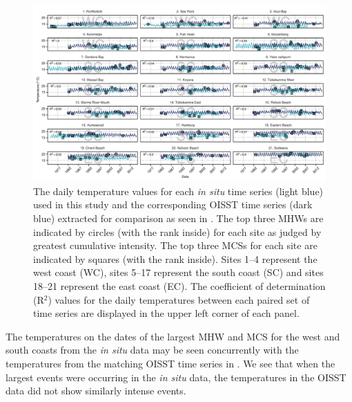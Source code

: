 \documentclass[a4paper,10pt,review]{elsarticle}
\begin{document}
\begin{figure}
\centering
\includegraphics[width=1.0\textwidth]{figure2.pdf}
\caption{The daily temperature values for each \emph{in situ} time series (light blue) used in this study and the corresponding OISST time series (dark blue) extracted for comparison as seen in . The top three MHWs are indicated by circles (with the rank inside) for each site as judged by greatest cumulative intensity. The top three MCSs for each site are indicated by squares (with the rank inside). Sites 1--4 represent the west coast (WC), sites 5--17 represent the south coast (SC) and sites 18--21 represent the east coast (EC). The coefficient of determination (R$^2$) values for the daily temperatures between each paired set of time series are displayed in the upper left corner of each panel.}
\label{fig:Figure2}
\end{figure}

The temperatures on the dates of the largest MHW and MCS for the west and south coasts from the \emph{in situ} data may be seen concurrently with the temperatures from the matching OISST time series in . We see that when the largest events were occurring in the \emph{in situ} data, the temperatures in the OISST data did not show similarly intense events.
\end{document}
